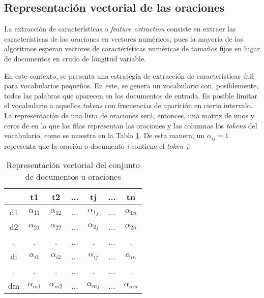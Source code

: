 \documentclass[conference]{IEEEtran}
\begin{document}
    
    \subsection{Representación vectorial de las oraciones}
    
        La extracción de características o \textit{feature extraction} consiste en extraer las características de las oraciones en vectores numéricos, pues la mayoría de los algoritmos esperan vectores de características numéricas de tamaños fijos en lugar de documentos en crudo de longitud variable.
        
        En este contexto, se presenta una estrategia de extracción de características útil para vocabularios pequeños. En este, se genera un vocabulario con, posiblemente, todas las palabras que aparecen en los documentos de entrada. Es posible limitar el vocabulario a aquellos \textit{tokens} con frecuencias de aparición en cierto intervalo. La representación de una lista de oraciones será, entonces, una matriz de unos y ceros de en la que las filas representan las oraciones y las columnas los \textit{tokens} del vocabulario, como se muestra en la Tabla \ref{tab:vectores1}. De esta manera, un $\alpha_{ij} = 1$ representa que la oración o documento \textit{i} contiene el \textit{token j}.
        
        \begin{table}[]
            \centering
            \caption{Representación vectorial del conjunto de documentos u oraciones}
            \label{tab:vectores1}
            \begin{tabular}{c|cccccc}
                   & t1            & t2            & ... & tj            & ... & tn \\ \hline
                d1 & $\alpha_{11}$ & $\alpha_{12}$ & ... & $\alpha_{1j}$ & ... & $\alpha_{1n}$ \\
                d2 & $\alpha_{21}$ & $\alpha_{22}$ & ... & $\alpha_{2j}$ & ... & $\alpha_{2n}$ \\
                .  & .             & .             & ... & .             & ... & . \\
                di & $\alpha_{i1}$ & $\alpha_{i2}$ & ... & $\alpha_{ij}$ & ... & $\alpha_{in}$ \\
                .  & .             & .             & ... & .             & ... & . \\
                dm & $\alpha_{m1}$ & $\alpha_{m2}$ & ... & $\alpha_{mj}$ & ... & $\alpha_{mn}$
            \end{tabular}
        \end{table}
    
\end{document}
